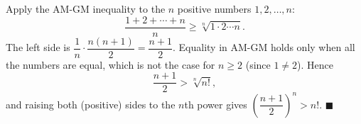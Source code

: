 Apply the AM-GM inequality to the $n$ positive numbers $1,2,\dots,n$:
\[\dfrac{1+2+\cdots+n}{n}\ge\sqrt[n]{1\cdot2\cdots n}.\]
The left side is $\dfrac{1}{n}\cdot\dfrac{n(n+1)}{2}=\dfrac{n+1}{2}$. Equality in AM-GM holds only when all the numbers are equal, which is not the case for $n\ge2$ (since $1\ne2$). Hence
\[\dfrac{n+1}{2}>\sqrt[n]{n!},\]
and raising both (positive) sides to the $n$th power gives $\left(\dfrac{n+1}{2}\right)^n>n!$. $\blacksquare$
